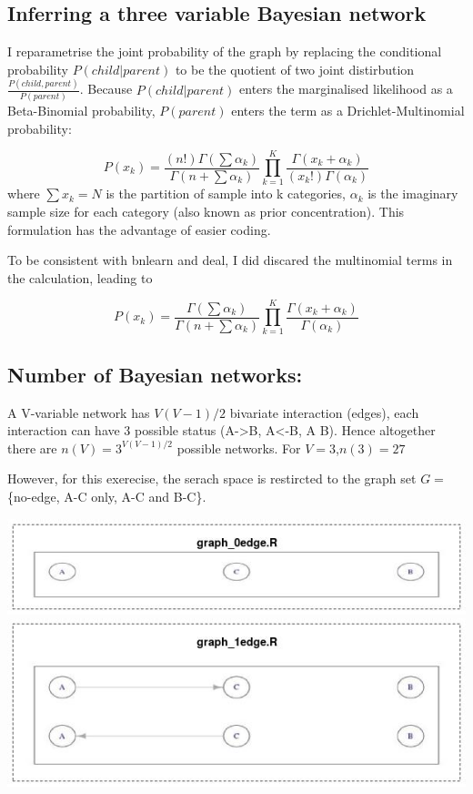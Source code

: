 \documentclass[]{article}
\theoremstyle{definition}
\theoremstyle{definition}
\theoremstyle{definition}
\theoremstyle{remark}
\begin{document}
\subsection{Inferring a three variable Bayesian
network}\label{inferring-a-three-variable-bayesian-network}

I reparametrise the joint probability of the graph by replacing the
conditional probability \(P(child|parent)\) to be the quotient of two
joint distirbution \(\frac{P(child,parent)}{P(parent)}\). Because
\(P(child|parent)\) enters the marginalised likelihood as a
Beta-Binomial probability, \(P(parent)\) enters the term as a
Drichlet-Multinomial probability:

\[
P(x_k)={\frac {\left(n!\right)\Gamma \left(\sum \alpha _{k}\right)}{\Gamma \left(n+\sum \alpha _{k}\right)}}\prod _{k=1}^{K}{\frac {\Gamma (x_{k}+\alpha _{k})}{\left(x_{k}!\right)\Gamma (\alpha _{k})}}
\] where \(\sum{x_k}=N\) is the partition of sample into k categories,
\(\alpha_k\) is the imaginary sample size for each category (also known
as prior concentration). This formulation has the advantage of easier
coding.

To be consistent with bnlearn and deal, I did discared the multinomial
terms in the calculation, leading to

\[
P(x_k)={\frac {\Gamma \left(\sum \alpha _{k}\right)}{\Gamma \left(n+\sum \alpha _{k}\right)}}\prod _{k=1}^{K}{\frac {\Gamma (x_{k}+\alpha _{k})}{\Gamma (\alpha _{k})}}
\]

\subsection{Number of Bayesian
networks:}\label{number-of-bayesian-networks}

A V-variable network has \(V(V-1)/2\) bivariate interaction (edges),
each interaction can have 3 possible status (A-\textgreater{}B,
A\textless{}-B, A B). Hence altogether there are \(n(V) = 3^{V(V-1)/2}\)
possible networks. For \(V=3\),\(n(3)=27\)

However, for this exerecise, the serach space is restircted to the graph
set \(G=\) \{no-edge, A-C only, A-C and B-C\}.

\includegraphics{graph_0edge.jpg} \includegraphics{graph_1edge.jpg}
\end{document}
